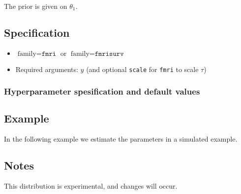 \documentclass[a4paper,11pt]{article}
\begin{document}
The prior is given on $\theta_1$.

\subsection*{Specification}

\begin{itemize}
\item $\text{family}=\texttt{fmri}$ or $\text{family}=\texttt{fmrisurv}$
\item Required arguments: $y$ (and optional \texttt{scale} for
    \texttt{fmri} to scale $\tau$)
\end{itemize}

\subsubsection*{Hyperparameter spesification and default values}



\subsection*{Example}

In the following example we estimate the parameters in a simulated
example.


\subsection*{Notes}

This distribution is experimental, and changes will occur.
\end{document}
